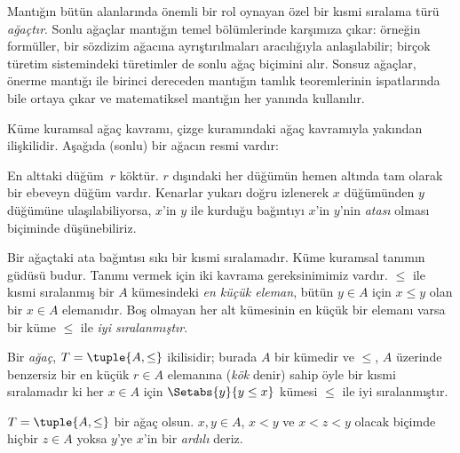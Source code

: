 \documentclass[../../../include/open-logic-section]{subfiles}
\begin{document}

Mantığın bütün alanlarında önemli bir rol oynayan özel bir kısmi sıralama türü
\emph{ağaçtır}. Sonlu ağaçlar mantığın temel bölümlerinde karşımıza çıkar:
örneğin formüller, bir sözdizim ağacına ayrıştırılmaları aracılığıyla
anlaşılabilir; birçok türetim sistemindeki türetimler de sonlu ağaç biçimini
alır.
%
Sonsuz ağaçlar, önerme mantığı ile birinci dereceden mantığın tamlık
teoremlerinin ispatlarında bile ortaya çıkar ve matematiksel mantığın
her yanında kullanılır.

Küme kuramsal ağaç kavramı, çizge kuramındaki ağaç kavramıyla yakından
ilişkilidir. Aşağıda (sonlu) bir ağacın resmi vardır:

\begin{center}
\end{center}

En alttaki düğüm~$r$ köktür. $r$ dışındaki her düğümün hemen altında tam
olarak bir ebeveyn düğüm vardır. Kenarlar yukarı doğru izlenerek $x$
düğümünden $y$ düğümüne ulaşılabiliyorsa, $x$'in $y$ ile kurduğu bağıntıyı
$x$'in $y$'nin \emph{atası} olması biçiminde düşünebiliriz.

Bir ağaçtaki ata bağıntısı sıkı bir kısmi sıralamadır. Küme kuramsal tanımın
güdüsü budur. Tanımı vermek için iki kavrama gereksinimimiz vardır. $\le$ ile
kısmi sıralanmış bir $A$ kümesindeki \emph{en küçük eleman}, bütün $y \in A$
için $x \le y$ olan bir $x \in A$ elemanıdır. Boş olmayan her alt kümesinin en
küçük bir elemanı varsa bir küme $\le$ ile \emph{iyi sıralanmıştır}.

\begin{defn}[Ağaç]
Bir \emph{ağaç}, $T=\tuple{A,\le}$ ikilisidir; burada $A$ bir kümedir ve
$\le$, $A$ üzerinde benzersiz bir en küçük $r \in A$ elemanına (\emph{kök}
denir) sahip öyle bir kısmi sıralamadır ki her $x \in A$ için
$\Setabs{y}{y \le x}$ kümesi $\le$ ile iyi sıralanmıştır.
\end{defn}

\begin{defn}[Ardıllar]
$T=\tuple{A,\le}$ bir ağaç olsun. $x,y \in A$, $x<y$ ve $x<z<y$ olacak
biçimde hiçbir $z \in A$ yoksa $y$'ye $x$'in bir \emph{ardılı} deriz.
\end{defn}
\end{document}
